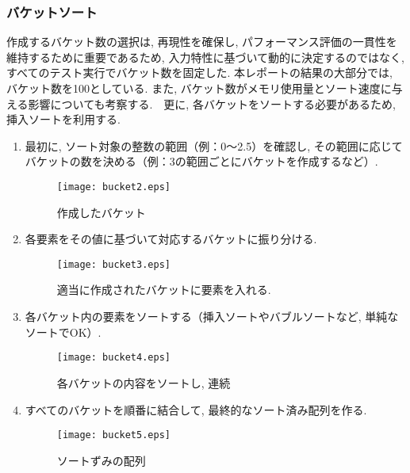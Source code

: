 \documentclass[a4j, 11pt]{jarticle}
\begin{document}
\subsubsection{バケットソート}
作成するバケット数の選択は, 再現性を確保し, パフォーマンス評価の一貫性を維持するために重要であるため, 入力特性に基づいて動的に決定するのではなく, すべてのテスト実行でバケット数を固定した. 本レポートの結果の大部分では, バケット数を100としている. また, バケット数がメモリ使用量とソート速度に与える影響についても考察する.　更に, 各バケットをソートする必要があるため, 挿入ソートを利用する.\cite{gfg:bucketsort2024}\\
\begin{enumerate}
  \begin{figure}[H]
    \centering
    \texttt{[image: bucket1.eps]}
    \caption{ソート対象データ}
  \end{figure}
  \item 最初に, ソート対象の整数の範囲（例：0〜2.5）を確認し, その範囲に応じてバケットの数を決める（例：3の範囲ごとにバケットを作成するなど）. 
  \begin{figure}[H]
    \centering
    \texttt{[image: bucket2.eps]}
    \caption{作成したバケット}
  \end{figure}
  \item 各要素をその値に基づいて対応するバケットに振り分ける. 
  \begin{figure}[H]
    \centering
    \texttt{[image: bucket3.eps]}
    \caption{適当に作成されたバケットに要素を入れる. }
  \end{figure}
  \newpage
  \item 各バケット内の要素をソートする（挿入ソートやバブルソートなど, 単純なソートでOK）. 
  \begin{figure}[H]
    \centering
    \texttt{[image: bucket4.eps]}
    \caption{各バケットの内容をソートし, 連続}
  \end{figure}
  \item すべてのバケットを順番に結合して, 最終的なソート済み配列を作る. 
  \begin{figure}[H]
    \centering
    \texttt{[image: bucket5.eps]}
    \caption{ソートずみの配列}
  \end{figure}
\end{enumerate}
\end{document}
